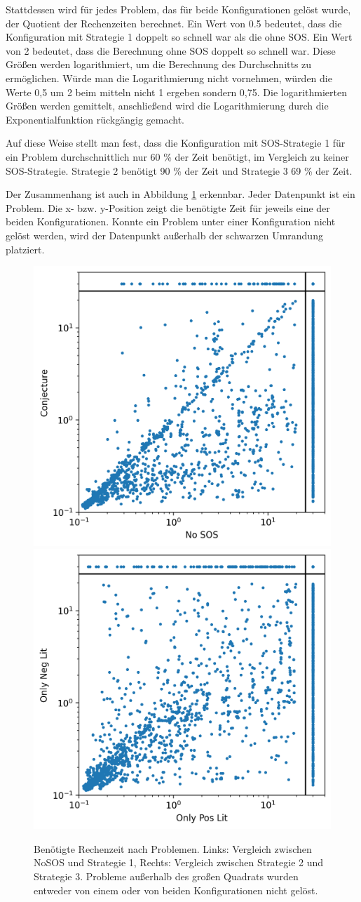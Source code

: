 		Stattdessen wird für jedes Problem, das für beide Konfigurationen gelöst wurde, der Quotient der Rechenzeiten berechnet. Ein Wert von 0.5 bedeutet, dass die Konfiguration mit Strategie 1 doppelt so schnell war als die ohne SOS. Ein Wert von 2 bedeutet, dass die Berechnung ohne SOS doppelt so schnell war. Diese Größen werden logarithmiert, um die Berechnung des Durchschnitts zu ermöglichen. Würde man die Logarithmierung nicht vornehmen, würden die Werte 0,5 um 2 beim mitteln nicht 1 ergeben sondern 0,75. Die logarithmierten Größen werden gemittelt, anschließend wird die Logarithmierung durch die Exponentialfunktion rückgängig gemacht.
		
		Auf diese Weise stellt man fest, dass die Konfiguration mit SOS-Strategie 1 für ein Problem durchschnittlich nur 60 \% der Zeit benötigt, im Vergleich zu keiner SOS-Strategie. Strategie 2 benötigt 90 \% der Zeit und 
		Strategie 3 69 \% der Zeit.
		
		
		Der Zusammenhang ist auch in Abbildung \ref{fig:directcompare} erkennbar. Jeder Datenpunkt ist ein Problem. Die x- bzw. y-Position zeigt die benötigte Zeit für jeweils eine der beiden Konfigurationen. Konnte ein Problem unter einer Konfiguration nicht gelöst werden, wird der Datenpunkt außerhalb der schwarzen Umrandung platziert.
		
		
		
		\begin{figure}
			\centering
			\includegraphics[width=0.45\linewidth]{images/Diagram/directCompare1_2}
			\includegraphics[width=0.45\linewidth]{images/Diagram/directCompare2_3}
			\caption{Benötigte Rechenzeit nach Problemen. Links: Vergleich zwischen NoSOS und Strategie 1, Rechts: Vergleich zwischen Strategie 2 und Strategie 3. Probleme außerhalb des großen Quadrats wurden entweder von einem oder von beiden Konfigurationen nicht gelöst.}
			\label{fig:directcompare}
		\end{figure}
	


